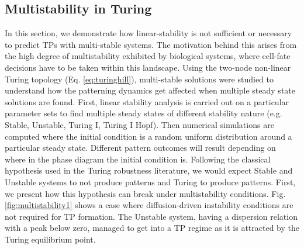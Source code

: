 \subsection{Multistability in Turing}
In this section, we demonstrate how linear-stability is not sufficient or necessary to predict TPs with multi-stable systems.
The motivation behind this arises from the high degree of multistability exhibited by biological systems, where cell-fate decisions have to be taken within this landscape. %
Using the two-node non-linear Turing topology (Eq. \eqref{eq:turinghill}), multi-stable solutions were studied to understand how the patterning dynamics get affected when multiple steady state solutions are found.
First, linear stability analysis is carried out on a particular parameter sets to find multiple steady states of different stability nature (e.g. Stable, Unstable, Turing I, Turing I Hopf).
Then numerical simulations are computed where the initial condition is a random uniform distribution around a particular steady state.
Different pattern outcomes will result depending on where in the phase diagram the initial condition is.
Following the classical hypothesis used in the Turing robustness literature, we would expect Stable and Unstable systems to not produce patterns and Turing to produce patterns.
First, we present how this hypothesis can break under multistability conditions.
Fig. \ref{fig:multistability1} shows a case where diffusion-driven instability conditions are not required for TP formation.
The Unstable system, having a dispersion relation with a peak below zero, managed to get into a TP regime as it is attracted by the Turing equilibrium point.




